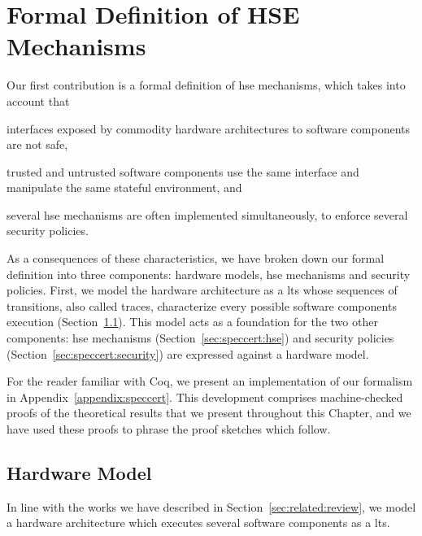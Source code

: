\chapter{Formal Definition of HSE Mechanisms}
\label{chapter:speccert}


\vspace{1cm}\noindent
%
Our first contribution is a formal definition of \ac{hse} mechanisms, which
takes into account that
%
\begin{inparaenum}[(1)]
\item interfaces exposed by commodity hardware architectures to software
  components are not safe,
\item trusted and untrusted software components use the same interface and
  manipulate the same stateful environment, and
\item several \ac{hse} mechanisms are often implemented simultaneously, to
  enforce several security policies.
\end{inparaenum}
%
As a consequences of these characteristics, we have broken down our formal
definition into three components: hardware models, \ac{hse} mechanisms and
security policies.
%
First, we model the hardware architecture as a \ac{lts} whose sequences of
transitions, also called traces, characterize every possible software components
execution (Section~\ref{sec:speccert:hardware}).
%
This model acts as a foundation for the two other components: \ac{hse}
mechanisms (Section~\ref{sec:speccert:hse}) and security policies
(Section~\ref{sec:speccert:security}) are expressed against a hardware model.

For the reader familiar with Coq, we present an implementation of our formalism
in Appendix~\ref{appendix:speccert}.
%
This development comprises machine-checked proofs of the theoretical results
that we present throughout this Chapter, and we have used these proofs to phrase
the proof sketches which follow.

\section{Hardware Model}
\label{sec:speccert:hardware}

In line with the works we have described in Section~\ref{sec:related:review}, we
model a hardware architecture which executes several software components as a
\ac{lts}.

